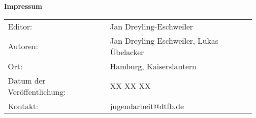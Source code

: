 \thispagestyle{empty}



\null
\vfill
\vfill
{\raggedright \normalfont \bfseries Impressum}
\vspace{0.5cm}

{
  \raggedright

\begin{tabular}{ll}
  Editor: & Jan Dreyling-Eschweiler 
    \\%
  Autoren: & Jan Dreyling-Eschweiler, Lukas Übelacker 
    \\%
  Ort: &  Hamburg, Kaiserslautern
    \\%
  Datum der Veröffentlichung: & XX XX XX
    \\%
  Kontakt: & jugendarbeit@dtfb.de
    \\%
\end{tabular}
}
\vfill

